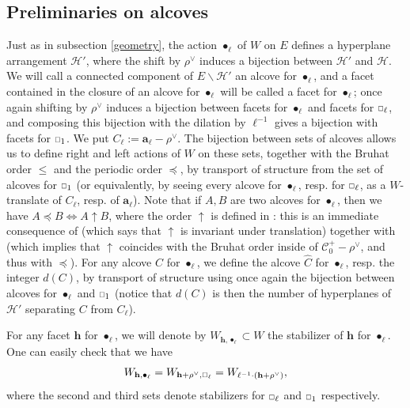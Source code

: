 \documentclass[11pt]{amsart}
\theoremstyle{plain}
\theoremstyle{remark}
\newcommand{\car}{\mbox{\relsize{-5}$\Box$}}
\numberwithin{equation}{section}
\begin{document}
	\subsection{Preliminaries on alcoves}
	Just as in subsection \ref{geometry}, the action $\bullet_\ell$ of $W$ on $E$ defines a hyperplane arrangement $\mathscr{H}'$, where the shift by $\rho^\vee$ induces a bijection between $\mathscr{H}'$ and $\mathscr{H}$. We will call a connected component of $E\backslash \mathscr{H}'$ an alcove for $\bullet_\ell$, and a facet contained in the closure of an alcove for $\bullet_\ell$ will be called a facet for $\bullet_\ell$; once again shifting by $\rho^\vee$ induces a bijection between facets for $\bullet_\ell$ and facets for $\car_\ell$, and composing this bijection with the dilation by $\ell^{-1}$ gives a bijection with facets for $\car_1$.  We put $C_\ell:=\mathbf{a}_\ell-\rho^\vee$. The bijection between sets of alcoves allows us to define right and left actions of $W$ on these sets, together with the Bruhat order $\leq$ and the periodic order $\preceq$, by transport of structure from the set of alcoves for $\car_1$ (or equivalently, by seeing every alcove for $\bullet_\ell$, resp. for $\car_\ell$, as a $W$-translate of $C_\ell$, resp. of $\mathbf{a}_\ell$). Note that if $A,B$ are two alcoves for $\bullet_\ell$, then we have $A\preceq B\Leftrightarrow A\uparrow B$, where the order $\uparrow$ is defined in \cite[§6]{jantzen2003representations}: this is an immediate consequence of  \cite[II, §6.6, (4)]{jantzen2003representations} (which says that $\uparrow$ is invariant under translation) together with \cite[II, Lemma 10.1]{achar2018reductive} (which implies that $\uparrow$ coincides with the Bruhat order inside of $\mathscr{C}^+_0-\rho^\vee$, and thus with $\preceq$). For any alcove $C$ for $\bullet_\ell$, we define the alcove $\hat{C}$ for $\bullet_\ell$, resp. the integer $d(C)$, by transport of structure using once again the bijection between alcoves for $\bullet_\ell$ and $\car_1$ (notice that  $d(C)$ is then the number of hyperplanes of $\mathscr{H}'$ separating $C$ from $C_\ell$).
	
	For any facet $\mathbf{h}$ for $\bullet_\ell$, we will denote by $W_{\mathbf{h},\bullet_\ell}\subset W$ the stabilizer of $\mathbf{h}$ for $\bullet_\ell$. One can easily check that we have 
	$$W_{\mathbf{h},\bullet_\ell}=W_{\mathbf{h}+\rho^\vee,\car_\ell}=W_{\ell^{-1}\cdot(\mathbf{h}+\rho^\vee)}, $$
	where the second and third sets denote stabilizers for $\car_\ell$ and $\car_1$ respectively.	
	
\end{document}
